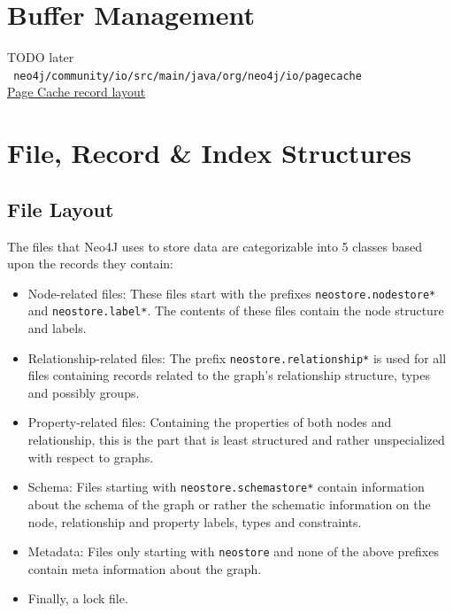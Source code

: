 \documentclass[a4paper,10pt]{article}
\begin{document}
    \newpage

 
\section{Buffer Management}
    TODO later \\
    \texttt{
    neo4j/community/io/src/main/java/org/neo4j/io/pagecache
    } \\
    \href{https://www.slideshare.net/thobe/an-overview-of-neo4j-internals}{Page Cache record layout} \\

    \newpage
 

\section{File, Record \& Index Structures}\label{structure}
    \subsection{File Layout}\label{files_sec}
        The files that Neo4J uses to store data are categorizable into 5 classes based upon the records they contain:
        \begin{itemize}
            \item Node-related files: These files start with the prefixes \texttt{neostore.nodestore*} and \texttt{neostore.label*}. The contents of these files contain the node structure and labels. 
            \item Relationship-related files: The prefix \texttt{neostore.relationship*} is used for all files containing records related to the graph's relationship structure, types and possibly groups.
            \item Property-related files: Containing the properties of both nodes and relationship, this is the part that is least structured and rather unspecialized with respect to graphs.
            \item Schema: Files starting with \texttt{neostore.schemastore*} contain information about the schema of the graph or rather the schematic information on the node, relationship and property labels, types and constraints.
            \item Metadata: Files only starting with \texttt{neostore} and none of the above prefixes contain meta information about the graph.
            \item Finally, a lock file.
        \end{itemize}
        
\end{document}
